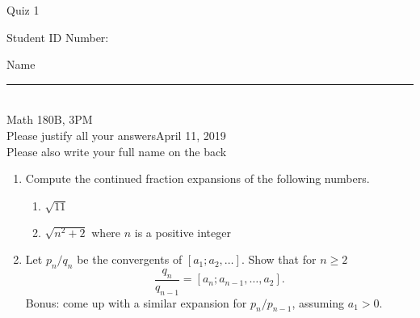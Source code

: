 \documentclass[12pt]{article}
\begin{document}
\begin{flushleft} 
\centerline{\LARGE{Quiz 1}} 
\vspace{5 mm}
{Student ID Number:}\hfill  
{Name \rule {2 in}{0.01in}}\\
Math 180B, 3PM
\\
{Please justify all your answers}\hfill {April 11, 2019}
\\
{Please also write your full name on the back} 

\medskip
\end{flushleft}

\begin{enumerate}
	\item Compute the continued fraction expansions of the following numbers.
	\begin{enumerate}
		\item $\sqrt{11}$
		\vfill
		\item $\sqrt{n^2+2}$ where $n$ is a positive integer
	\end{enumerate}
	\vfill
	\item Let $p_n/q_n$ be the convergents of $[a_1; a_2, \ldots]$. Show that for $n\geq 2$
	\[
	\frac{q_n}{q_{n-1}} = [a_n; a_{n-1}, \ldots, a_2].
	\]
	Bonus: come up with a similar expansion for $p_n/p_{n-1}$, assuming $a_1>0$.
	\vfill
\end{enumerate}

\end{document}
